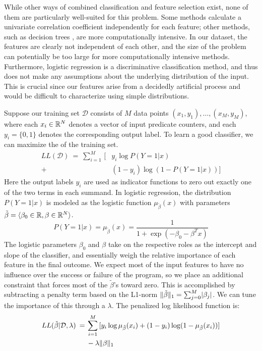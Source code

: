 While other ways of combined classification and feature selection
exist, none of them are particularly well-suited for this problem.
Some methods \cite{Golub:MCC:1999,Tibshirani2002} calculate a
univariate correlation coefficient independently for each feature;
other methods, such as decision trees \cite{00000048}, are more
computationally intensive.  In our dataset, the features are clearly
not independent of each other, and the size of the problem can
potentially be too large for more computationally intensive methods.
Furthermore, logistic regression is a discriminative classification
method, and thus does not make any assumptions about the underlying
distribution of the input.  This is crucial since our features arise
from a decidedly artificial process and would be difficult to
characterize using simple distributions.

Suppose our training set $\mathcal{D}$ consists of $M$ data points
$(x_1,y_1), \ldots, (x_M, y_M) $, where each $x_i \in \mathbb{R}^N$ denotes
a vector of input predicate counters, and each $y_i = \{0, 1\}$
denotes the corresponding output label.  To learn a good classifier,
we can maximize the  of the training set.
\begin{equation*}
  \begin{split}
    LL(\mathcal{D}) \:=\:
    \sum_{i=1}^M \, [ & y_i \log P(Y = 1 | x) \\
    + & (1 - y_i) \log (1 - P(Y = 1 | x)) ]
  \end{split}
\end{equation*}
Here the output labels $y_i$ are used as indicator functions to zero
out exactly one of the two terms in each summand.  In logistic
regression, the distribution $P(Y=1|x)$ is modeled as the logistic
function $\mu_{\tilde{\beta}}(x)$ with parameters $\tilde{\beta} = \langle \beta_0 \in
\mathbb{R}, \beta \in \mathbb{R}^N \rangle$.
\begin{equation*}
  P(Y = 1 | x) = \mu_{\tilde{\beta}} (x) = \frac{1}{1 + \exp(- \beta_0 - \beta^T x)}
\end{equation*}
The logistic parameters $\beta_0$ and $\beta$ take on the respective roles as
the intercept and slope of the classifier, and essentially weigh the
relative importance of each feature in the final outcome.  We expect
most of the input features to have no influence over the success or
failure of the program, so we place an additional constraint that
forces most of the $\tilde{\beta}$'s toward zero.  This is accomplished by
subtracting a penalty term based on the L1-norm $\lVert\tilde{\beta}\rVert_1 =
\sum_{j=0}^M \lvert\beta_j\rvert$.  We can tune the importance of this
 through a  $\lambda$.  The penalized log likelihood function is:
\begin{equation*}
  \begin{split}
    LL (\tilde{\beta} | \mathcal{D}, \lambda ) \:=\:
    & \sum_{i=1}^M \, [y_i \log \mu_{\tilde{\beta}} (x_i) + (1 - y_i) \log (1 - \mu_{\tilde{\beta}} (x_i))] \\
    & - \lambda \lVert\beta\rVert_1
  \end{split}
\end{equation*}

